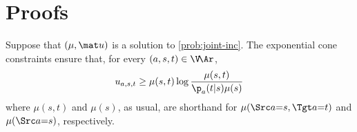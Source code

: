 \section{Proofs}



\begin{lproof}
    \label{proof:joint-inc-correct}
    Suppose that $(\mu, \mat u)$ is a solution to \eqref{prob:joint-inc}.
    The exponential cone constraints ensure that, for every $(a, s,t) \in \V\!\Ar$, 
    $$
        u_{a,s,t} \ge \mu(s,t) \log \frac{\mu(s,t)}{\p_a(t|s)\mu(s)}
    $$
    where $\mu(s,t)$ and $\mu(s)$, as usual, are shorthand for $\mu(\Src a{=}s, \Tgt a{=}t)$ and $\mu(\Src a {=} s)$, respectively.
    

\end{lproof}
